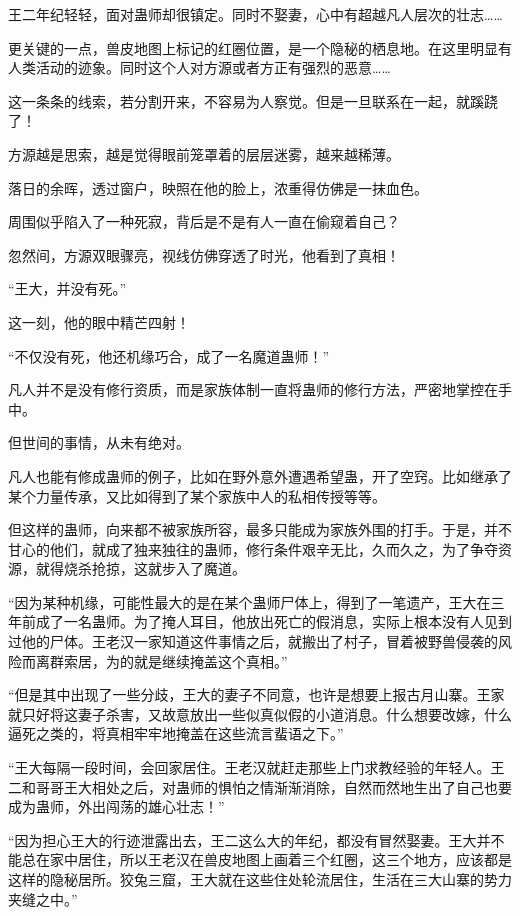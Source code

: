\begin{this_body}
王二年纪轻轻，面对蛊师却很镇定。同时不娶妻，心中有超越凡人层次的壮志……

更关键的一点，兽皮地图上标记的红圈位置，是一个隐秘的栖息地。在这里明显有人类活动的迹象。同时这个人对方源或者方正有强烈的恶意……

这一条条的线索，若分割开来，不容易为人察觉。但是一旦联系在一起，就蹊跷了！

方源越是思索，越是觉得眼前笼罩着的层层迷雾，越来越稀薄。

落日的余晖，透过窗户，映照在他的脸上，浓重得仿佛是一抹血色。

周围似乎陷入了一种死寂，背后是不是有人一直在偷窥着自己？

忽然间，方源双眼骤亮，视线仿佛穿透了时光，他看到了真相！

“王大，并没有死。”

这一刻，他的眼中精芒四射！

“不仅没有死，他还机缘巧合，成了一名魔道蛊师！”

凡人并不是没有修行资质，而是家族体制一直将蛊师的修行方法，严密地掌控在手中。

但世间的事情，从未有绝对。

凡人也能有修成蛊师的例子，比如在野外意外遭遇希望蛊，开了空窍。比如继承了某个力量传承，又比如得到了某个家族中人的私相传授等等。

但这样的蛊师，向来都不被家族所容，最多只能成为家族外围的打手。于是，并不甘心的他们，就成了独来独往的蛊师，修行条件艰辛无比，久而久之，为了争夺资源，就得烧杀抢掠，这就步入了魔道。

“因为某种机缘，可能性最大的是在某个蛊师尸体上，得到了一笔遗产，王大在三年前成了一名蛊师。为了掩人耳目，他放出死亡的假消息，实际上根本没有人见到过他的尸体。王老汉一家知道这件事情之后，就搬出了村子，冒着被野兽侵袭的风险而离群索居，为的就是继续掩盖这个真相。”

“但是其中出现了一些分歧，王大的妻子不同意，也许是想要上报古月山寨。王家就只好将这妻子杀害，又故意放出一些似真似假的小道消息。什么想要改嫁，什么逼死之类的，将真相牢牢地掩盖在这些流言蜚语之下。”

“王大每隔一段时间，会回家居住。王老汉就赶走那些上门求教经验的年轻人。王二和哥哥王大相处之后，对蛊师的惧怕之情渐渐消除，自然而然地生出了自己也要成为蛊师，外出闯荡的雄心壮志！”

“因为担心王大的行迹泄露出去，王二这么大的年纪，都没有冒然娶妻。王大并不能总在家中居住，所以王老汉在兽皮地图上画着三个红圈，这三个地方，应该都是这样的隐秘居所。狡兔三窟，王大就在这些住处轮流居住，生活在三大山寨的势力夹缝之中。”


\end{this_body}
